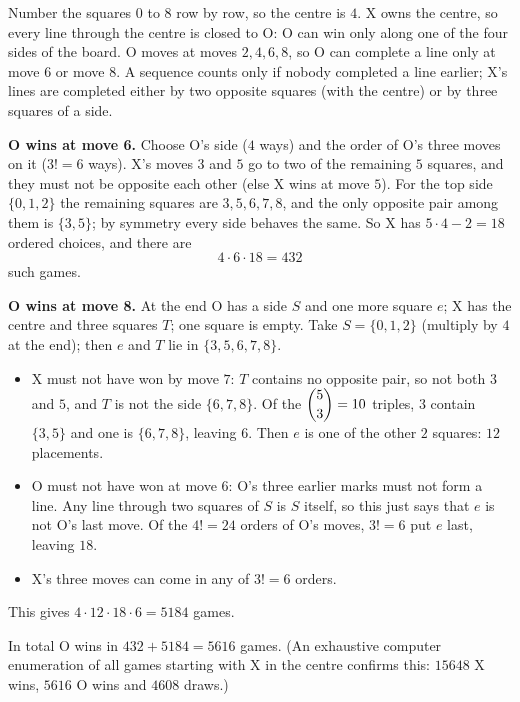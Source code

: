 Number the squares $0$ to $8$ row by row, so the centre is $4$. X owns the centre, so every line through the centre is closed to O: O can win only along one of the four sides of the board. O moves at moves $2,4,6,8$, so O can complete a line only at move $6$ or move $8$. A sequence counts only if nobody completed a line earlier; X's lines are completed either by two opposite squares (with the centre) or by three squares of a side.

\textbf{O wins at move 6.} Choose O's side ($4$ ways) and the order of O's three moves on it ($3!=6$ ways). X's moves $3$ and $5$ go to two of the remaining $5$ squares, and they must not be opposite each other (else X wins at move $5$). For the top side $\{0,1,2\}$ the remaining squares are $3,5,6,7,8$, and the only opposite pair among them is $\{3,5\}$; by symmetry every side behaves the same. So X has $5\cdot4-2=18$ ordered choices, and there are
\[
4\cdot6\cdot18=432
\]
such games.

\textbf{O wins at move 8.} At the end O has a side $S$ and one more square $e$; X has the centre and three squares $T$; one square is empty. Take $S=\{0,1,2\}$ (multiply by $4$ at the end); then $e$ and $T$ lie in $\{3,5,6,7,8\}$.
\begin{itemize}
\item X must not have won by move $7$: $T$ contains no opposite pair, so not both $3$ and $5$, and $T$ is not the side $\{6,7,8\}$. Of the $\dbinom53=10$ triples, $3$ contain $\{3,5\}$ and one is $\{6,7,8\}$, leaving $6$. Then $e$ is one of the other $2$ squares: $12$ placements.
\item O must not have won at move $6$: O's three earlier marks must not form a line. Any line through two squares of $S$ is $S$ itself, so this just says that $e$ is not O's last move. Of the $4!=24$ orders of O's moves, $3!=6$ put $e$ last, leaving $18$.
\item X's three moves can come in any of $3!=6$ orders.
\end{itemize}
This gives $4\cdot12\cdot18\cdot6=5184$ games.

In total O wins in $432+5184=\boxed{5616}$ games. (An exhaustive computer enumeration of all games starting with X in the centre confirms this: $15648$ X wins, $5616$ O wins and $4608$ draws.)
